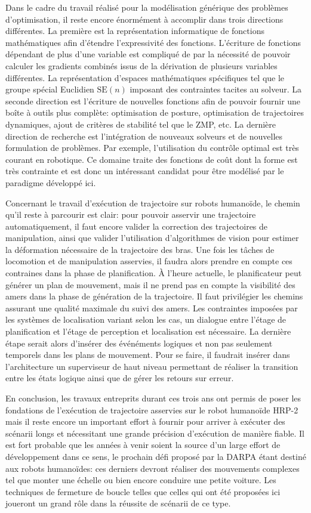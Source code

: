Dans le cadre du travail réalisé pour la modélisation générique des
problèmes d'optimisation, il reste encore énormément à accomplir dans
trois directions différentes. La première est la représentation
informatique de fonctions mathématiques afin d'étendre l'expressivité
des fonctions. L'écriture de fonctions dépendant de plus d'une
variable est compliqué de par la nécessité de pouvoir calculer les
gradients combinés issus de la dérivation de plusieurs variables
différentes. La représentation d'espaces mathématiques spécifiques tel
que le groupe spécial Euclidien $\text{SE}(n)$ imposant des
contraintes tacites au solveur. La seconde direction est l'écriture de
nouvelles fonctions afin de pouvoir fournir une boîte à outils plus
complète: optimisation de posture, optimisation de trajectoires
dynamiques, ajout de critères de stabilité tel que le ZMP, etc. La
dernière direction de recherche est l'intégration de nouveaux solveurs
et de nouvelles formulation de problèmes. Par exemple, l'utilisation
du contrôle optimal est très courant en robotique. Ce domaine traite
des fonctions de coût dont la forme est très contrainte et est donc un
intéressant candidat pour être modélisé par le paradigme développé
ici.


Concernant le travail d'exécution de trajectoire sur robots humanoïde,
le chemin qu'il reste à parcourir est clair: pour pouvoir asservir une
trajectoire automatiquement, il faut encore valider la correction des
trajectoires de manipulation, ainsi que valider l'utilisation
d'algorithmes de vision pour estimer la déformation nécessaire de la
trajectoire des bras. Une fois les tâches de locomotion et de
manipulation asservies, il faudra alors prendre en compte ces
contraines dans la phase de planification. À l'heure actuelle, le
planificateur peut générer un plan de mouvement, mais il ne prend pas
en compte la visibilité des amers dans la phase de génération de la
trajectoire. Il faut privilégier les chemins assurant une qualité
maximale du suivi des amers. Les contraintes imposées par les systèmes
de localisation variant selon les cas, un dialogue entre l'étage de
planification et l'étage de perception et localisation est nécessaire.
La dernière étape serait alors d'insérer des événéments logiques et
non pas seulement temporels dans les plans de mouvement. Pour se
faire, il faudrait insérer dans l'architecture un superviseur de haut
niveau permettant de réaliser la transition entre les états logique
ainsi que de gérer les retours sur erreur.


En conclusion, les travaux entreprits durant ces trois ans ont permis
de poser les fondations de l'exécution de trajectoire asservies sur le
robot humanoïde HRP-2 mais il reste encore un important effort à
fournir pour arriver à exécuter des scénarii longs et nécessitant une
grande précision d'exécution de manière fiable. Il est fort probable
que les années à venir soient la source d'un large effort de
développement dans ce sens, le prochain défi proposé par la DARPA
étant destiné aux robots humanoïdes: ces derniers devront réaliser des
mouvements complexes tel que monter une échelle ou bien encore
conduire une petite voiture. Les techniques de fermeture de boucle
telles que celles qui ont été proposées ici joueront un grand rôle
dans la réussite de scénarii de ce type.
